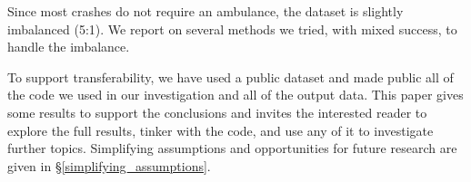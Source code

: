 Since most crashes do not require an ambulance, the dataset is slightly imbalanced (5:1).  We report on several methods we tried, with mixed success, to handle the imbalance.

To support transferability, we have used a public dataset and made public all of the code we used in our investigation and all of the output data.  This paper gives some results to support the conclusions and invites the interested reader to explore the full results, tinker with the code, and use any of it to investigate further topics.  Simplifying assumptions and opportunities for future research are given in \S \ref{simplifying_assumptions}.







